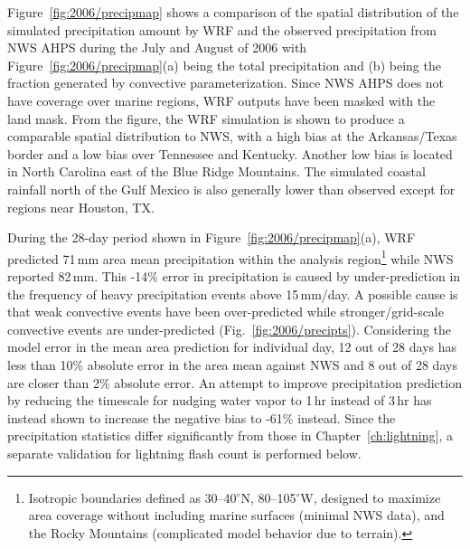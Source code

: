 
Figure~\ref{fig:2006/precipmap} shows a comparison of the spatial distribution of the simulated precipitation
amount by WRF and the observed precipitation from NWS AHPS during the July and August of 2006 with
Figure~\ref{fig:2006/precipmap}(a) being the total precipitation and (b) being the fraction generated by
convective parameterization. Since NWS AHPS does not have coverage over marine regions, 
WRF outputs have been masked with the land mask. From the figure, the WRF simulation is shown to produce a
comparable spatial distribution to NWS, with a high bias at the Arkansas/Texas border and a low bias over
Tennessee and Kentucky. Another low bias is located in North Carolina east of the Blue Ridge Mountains.
The simulated coastal rainfall north of the Gulf Mexico is also generally lower than observed except for regions
near Houston, TX.


During the 28-day period shown in Figure~\ref{fig:2006/precipmap}(a), WRF predicted 71\,\unit{mm} area mean
precipitation within the analysis region\footnote{Isotropic boundaries defined as 30--40$^\circ$N, 80--105$^\circ$W, designed
to maximize area coverage without including marine surfaces (minimal NWS data), and the Rocky Mountains (complicated
model behavior due to terrain).} while NWS reported 82\,\unit{mm}. This -14\% error in precipitation
is caused by under-prediction in the frequency of heavy precipitation events above 15\,\unit{mm/day}. A possible
cause is that weak convective events have been over-predicted while stronger/grid-scale convective
events are under-predicted (Fig.~\ref{fig:2006/precipts}).  Considering the model error in the mean area prediction for individual day, 12 out of
28 days has less than 10\% absolute error in the area mean against NWS and 8 out of 28 days are closer than
2\% absolute error. An attempt to improve precipitation prediction by reducing the timescale for nudging
water vapor to 1\,\unit{hr} instead of 3\,\unit{hr} has instead shown to increase the negative bias to -61\% instead.
Since the precipitation statistics differ significantly from those in Chapter~\ref{ch:lightning}, a separate validation
for lightning flash count is performed below.

